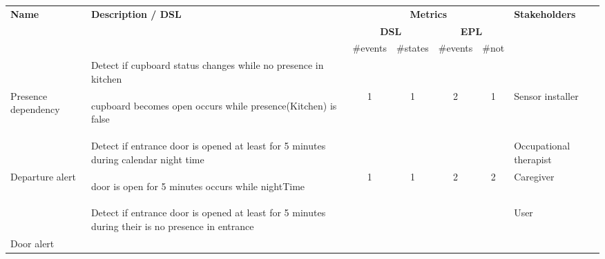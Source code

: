 \begin{table*}[!h]
  \scriptsize
  \begin{tabular}{|p{1.45cm}|p{8cm}|c|c|c|c|p{1.65cm}|} 
    \hline
    \multirow{3}{*}{\textbf{Name}}&\multirow{3}{*}{\textbf{Description / DSL}}&\multicolumn{4}{c|}{\textbf{Metrics}}&\multirow{3}{*}{\textbf{Stakeholders}}\\
    \cline{3-6}
                                  &                 &\multicolumn{2}{c|}{\textbf{DSL}}&\multicolumn{2}{c|}{\textbf{EPL}}&\\
                                  & & \#events & \#states & \#events & \#not &\\
    \hline
     & \cellcolor{gray!15}Detect if cupboard status changes while no presence in kitchen& & & & & \\ %
    Presence dependency  & \begin{mtext}             
      cupboard becomes open occurs while presence(Kitchen) is false 
    \end{mtext} & 1 & 1 & 2 & 1 & Sensor installer\\
    \hline
     & \cellcolor{gray!15} Detect if entrance door is opened at least for 5 minutes during calendar night time & & & & & Occupational therapist\\
    Departure alert & \begin{mtext}  
      door is open for 5 minutes occurs while nightTime
    \end{mtext} & 1 & 1 & 2 & 2 & Caregiver  \\ 
    \hline
    & \cellcolor{gray!15} Detect if entrance door is opened at least for 5 minutes during their is no presence in entrance& & & & &User \\
                                  Door alert & \begin{mtext}

\end{mtext}
\end{tabular}
\end{table*}
